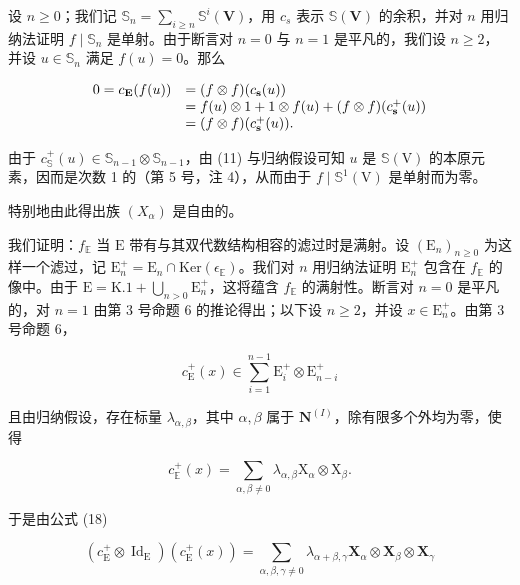 设 \(n \geqslant 0\)；我们记 \(\mathbb{S}_n = \sum_{i \geqslant n} \mathbb{S}^i(\mathbf{V})\)，用 \(c_s\) 表示 \(\mathbb{S}(\mathbf{V})\) 的余积，并对 \(n\) 用归纳法证明 \(f \mid \mathbb{S}_n\) 是单射。由于断言对 \(n = 0\) 与 \(n = 1\) 是平凡的，我们设 \(n \geqslant 2\)，并设 \(u \in \mathbb{S}_n\) 满足 \(f(u) = 0\)。那么

\[
\begin{array}{r l} {0 = c _ {\mathbf {E}} (f (u))} & {= (f \otimes f) (c _ {\mathbf {s}} (u))} \\ & {= f (u) \otimes 1 + 1 \otimes f (u) + (f \otimes f) (c _ {\mathbf {s}} ^ {+} (u))} \\ & {= (f \otimes f) (c _ {\mathbf {s}} ^ {+} (u)).} \end{array}
\]

由于 \(c_{\mathbb{S}}^{+}(u) \in \mathbb{S}_{n-1} \otimes \mathbb{S}_{n-1}\)，由 (11) 与归纳假设可知 \(u\) 是 \(\mathbb{S}(\mathrm{V})\) 的本原元素，因而是次数 1 的（第 5 号，注 4），从而由于 \(f \mid \mathbb{S}^1(\mathrm{V})\) 是单射而为零。

特别地由此得出族 \((X_{\alpha})\) 是自由的。

我们证明：\(f_{\mathbb{E}}\) 当 \(\mathrm{E}\) 带有与其双代数结构相容的滤过时是满射。设 \((\mathrm{E}_n)_{n\geqslant 0}\) 为这样一个滤过，记 \(\mathrm{E}_n^+ = \mathrm{E}_n\cap \mathrm{Ker}(\epsilon_{\mathbb{E}})\)。我们对 \(n\) 用归纳法证明 \(\mathrm{E}_n^+\) 包含在 \(f_{\mathbb{E}}\) 的像中。由于 \(\mathrm{E} = \mathrm{K}.1 + \bigcup_{n > 0}\mathrm{E}_n^+\)，这将蕴含 \(f_{\mathbb{E}}\) 的满射性。断言对 \(n = 0\) 是平凡的，对 \(n = 1\) 由第 3 号命题 6 的推论得出；以下设 \(n\geqslant 2\)，并设 \(x\in \mathrm{E}_n^+\)。由第 3 号命题 6，

\[
c _ {\mathrm{E}} ^ {+} (x) \in \sum_ {i = 1} ^ {n - 1} \mathrm{E} _ {i} ^ {+} \otimes \mathrm{E} _ {n - i} ^ {+}
\]

且由归纳假设，存在标量 \(\lambda_{\alpha, \beta}\)，其中 \(\alpha, \beta\) 属于 \(\mathbf{N}^{(I)}\)，除有限多个外均为零，使得

\[
c _ {\mathbb {E}} ^ {+} (x) = \sum_ {\alpha , \beta \neq 0} \lambda_ {\alpha , \beta} \mathrm{X} _ {\alpha} \otimes \mathrm{X} _ {\beta}.\tag{19}
\]

于是由公式 (18)

\[
(c _ {\mathrm{E}} ^ {+} \otimes \operatorname{Id} _ {\mathrm{E}}) (c _ {\mathrm{E}} ^ {+} (x)) = \sum_ {\alpha , \beta , \gamma \neq 0} \lambda_ {\alpha + \beta , \gamma} \mathbf {X} _ {\alpha} \otimes \mathbf {X} _ {\beta} \otimes \mathbf {X} _ {\gamma}
\]

